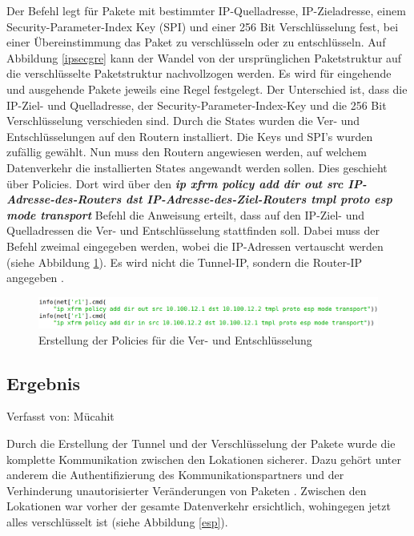 \documentclass[fontsize=12pt,paper=a4,open=any,parskip=half,
  twoside=false,toc=listof,toc=bibliography,fleqn,leqno,
  captions=nooneline,captions=tableabove,british]{scrbook}
\begin{document}
Der Befehl legt für Pakete mit bestimmter IP-Quelladresse, IP-Zieladresse, einem Security-Parameter-Index Key (SPI) und einer 256 Bit Verschlüsselung fest, bei einer Übereinstimmung das Paket zu verschlüsseln oder zu entschlüsseln. Auf Abbildung \ref{ipsecgre} kann der Wandel von der ursprünglichen Paketstruktur auf die verschlüsselte Paketstruktur nachvollzogen werden. Es wird für eingehende und ausgehende Pakete jeweils eine Regel festgelegt. Der Unterschied ist, dass die IP-Ziel- und Quelladresse, der Security-Parameter-Index-Key und die 256 Bit Verschlüsselung verschieden sind. Durch die States wurden die Ver- und Entschlüsselungen auf den Routern installiert. Die Keys und SPI’s wurden zufällig gewählt. Nun muss den Routern angewiesen werden, auf welchem Datenverkehr die installierten States angewandt werden sollen. Dies geschieht über Policies. Dort wird über den \textit{\textbf{ip xfrm policy add dir out src IP-Adresse-des-Routers dst IP-Adresse-des-Ziel-Routers tmpl proto esp mode transport}} Befehl die Anweisung erteilt, dass auf den IP-Ziel- und Quelladressen die Ver- und Entschlüsselung stattfinden soll. Dabei muss der Befehl zweimal eingegeben werden, wobei die IP-Adressen vertauscht werden (siehe Abbildung \ref{policy}). Es wird nicht die Tunnel-IP, sondern die Router-IP angegeben \cite{xfrm}.

\begin{figure}[H]
 \centering
 \includegraphics[width=1.0\textwidth]{Bilder/policy}
 \captionsetup{justification=centering}
 \caption{Erstellung der Policies für die Ver- und Entschlüsselung}
 \label{policy}
\end{figure}

\subsection{Ergebnis}
{\tiny Verfasst von: Mücahit\par}
Durch die Erstellung der Tunnel und der Verschlüsselung der Pakete wurde die komplette Kommunikation zwischen den Lokationen sicherer. Dazu gehört unter anderem die Authentifizierung des Kommunikationspartners und der Verhinderung unautorisierter Veränderungen von Paketen \cite{espsecurity}. Zwischen den Lokationen war vorher der gesamte Datenverkehr ersichtlich, wohingegen jetzt alles verschlüsselt ist (siehe Abbildung \ref{esp}).
\end{document}
